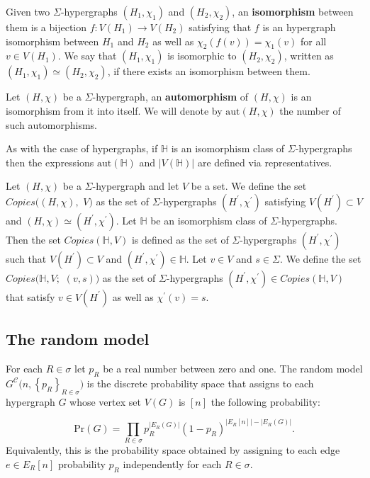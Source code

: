 \documentclass[12pt,notitlepage,a4paper]{article}
\theoremstyle{definition}
\newcommand{\InR}[1]{\left\{ #1_R \right\}_{R\in \sigma}}
\newcommand{\aut}{\mathrm{aut}}
\begin{document}
	Given two $\Sigma$-hypergraphs $(H_1,\chi_1)$
	and $(H_2,\chi_2)$, an \textbf{isomorphism} between them is
	a bijection $f:V(H_1)\rightarrow V(H_2)$ satisfying
	that $f$ is an hypergraph isomorphism between $H_1$ and
	$H_2$ as well as $\chi_2(f(v))=\chi_1(v)$ for all $v\in V(H_1)$.
	We say that $(H_1,\chi_1)$ is isomorphic to $(H_2,\chi_2)$,
	written as $(H_1, \chi_1)\simeq (H_2,\chi_2)$, if there exists an
	isomorphism between them.
	\par	 
	Let $(H,\chi)$ be a $\Sigma$-hypergraph, an 
	\textbf{automorphism} of $(H,\chi)$ is an 
	isomorphism from it into itself. We will denote
	by $\aut(H,\chi)$ the number of such automorphisms. 
	\par
	As with the case of hypergraphs, if $\mathbb{H}$ is 
	an isomorphism class of $\Sigma$-hypergraphs
	then the expressions $\aut(\mathbb{H})$ and
	$|V(\mathbb{H})|$ are defined via representatives. \par
	Let $(H,\chi)$ be a $\Sigma$-hypergraph and let $V$ be a set.
	We define the set $Copies\big(
	(H,\chi),\, \, V\big)$ as the set of $\Sigma$-hypergraphs
	$(H^\prime,\chi^\prime)$ satisfying $V(H^\prime)\subset V$ and
	$(H,\chi)\simeq (H^\prime,\chi^\prime)$. Let $\mathbb{H}$ be 
	an isomorphism class of $\Sigma$-hypergraphs. Then the set
	$Copies(\mathbb{H}, V)$ is defined as the set of $\Sigma$-hypergraphs
	$(H^\prime,\chi^\prime)$ such that 
	$V(H^\prime)\subset V$ and
	$(H^\prime,\chi^\prime)\in \mathbb{H}$. 
	Let $v\in V$ and $s\in \Sigma$. We define the
	set $Copies\big(\mathbb{H}, V;\,\, (v,s)\big)$ 
	as the set of $\Sigma$-hypergraphs
	$(H^\prime,\chi^\prime)\in Copies(\mathbb{H}, V)$
	that satisfy $v\in V(H^\prime)$ as well as
	$\chi^\prime(v)=s$. 


\subsection{The random model} \label{sect:random}

For each $R\in \sigma$ let
$p_R$ be a real number between zero and one.
The random model $G^{\mathcal{C}}\Big(n,\InR{p}\Big)$ 
is the discrete probability space that
assigns to each hypergraph $G$ whose vertex
set $V(G)$ is $[n]$ the following probability:

\[ \mathrm{Pr}(G)=\prod_{R\in \sigma} p_R^{|E_R(G)|}
(1-p_R)^{ \big|E_R[n]\big|-\big|E_R(G)\big|}.	
\]
Equivalently, this is the probability space obtained by 
assigning to each edge $e\in E_R[n]$ probability 
$p_R$ independently for each $R\in \sigma$. \par
\end{document}

